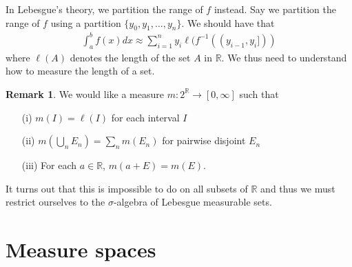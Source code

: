 \documentclass[11pt]{amsart}
\theoremstyle{definition}
\newtheorem{remark}[theorem]{Remark}
\numberwithin{equation}{section}
\begin{document}
In Lebesgue's theory, we partition the range of $f$ instead. Say we partition the range of $f$ using a partition $\{y_0,y_1,\ldots,y_n\}$. We should have that
\begin{align*}
    \int_a^bf(x)dx\approx\sum_{i=1}^ny_i\ell(f^{-1}((y_{i-1},y_i]))
\end{align*}
where $\ell(A)$ denotes the length of the set $A$ in $\mathbb R$. We thus need to understand how to measure the length of a set.
\begin{remark}
    We would like a measure $m:2^\mathbb R\to[0,\infty]$ such that
    \begin{enumerate}
        \item [(i)] $m(I)=\ell(I)$ for each interval $I$
        \item [(ii)] $m(\bigcup_n E_n)=\sum_n m(E_n)$ for pairwise disjoint $E_n$
        \item [(iii)] For each $a\in\mathbb R$, $m(a+E)=m(E)$.
    \end{enumerate}
    It turns out that this is impossible to do on all subsets of $\mathbb R$ and thus we must restrict ourselves to the $\sigma$-algebra of Lebesgue measurable sets.
\end{remark}
\newpage
\section{Measure spaces}
\end{document}
